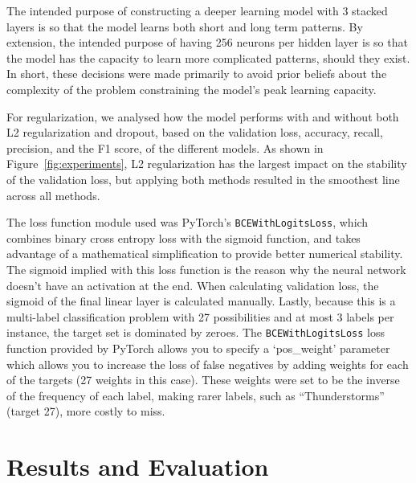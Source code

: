 \documentclass[11pt]{article}
\begin{document}
The intended purpose of constructing a deeper learning model with 3 stacked layers is so that the model learns both short and long term patterns. By extension, the intended purpose of having 256 neurons per hidden layer is so that the model has the capacity to learn more complicated patterns, should they exist. In short, these decisions were made primarily to avoid prior beliefs about the complexity of the problem constraining the model’s peak learning capacity.

For regularization, we analysed how the model performs with and without both L2 regularization and dropout, based on the validation loss, accuracy, recall, precision, and the F1 score, of the different models. As shown in Figure~\ref{fig:experiments}, L2 regularization has the largest impact on the stability of the validation loss, but applying both methods resulted in the smoothest line across all methods.



The loss function module used was PyTorch’s \verb|BCEWithLogitsLoss|, which combines binary cross entropy loss with the sigmoid function, and takes advantage of a mathematical simplification to provide better numerical stability. The sigmoid implied with this loss function is the reason why the neural network doesn’t have an activation at the end. When calculating validation loss, the sigmoid of the final linear layer is calculated manually.
Lastly, because this is a multi-label classification problem with 27 possibilities and at most 3 labels per instance, the target set is dominated by zeroes. The \verb|BCEWithLogitsLoss| loss function provided by PyTorch allows you to specify a ‘pos\_weight’ parameter which allows you to increase the loss of false negatives by adding weights for each of the targets (27 weights in this case). These weights were set to be the inverse of the frequency of each label, making rarer labels, such as “Thunderstorms” (target 27), more costly to miss.

\section{Results and Evaluation}
\end{document}
